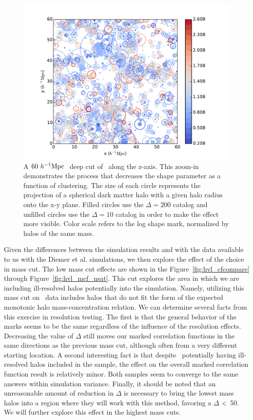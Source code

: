 \documentclass[usenatbib,usegraphicx,letterpaper]{mn2e}
\begin{document}
\begin{figure}
	\centering
	\includegraphics[width=1\textwidth]{plotcircles_coolwarm.pdf}
	\caption{A $60 \ h^{-1}\mathrm{Mpc}~$ deep cut of \simB \ along the z-axis. This zoom-in demonstrates the process that decreases the shape parameter as a function of clustering. The size of each circle represents the projection of a spherical dark matter halo with a given halo radius onto the x-y plane. Filled circles use the $\Delta = 200$ catalog and unfilled circles use the $\Delta = 10$ catalog in order to make the effect more visible. Color scale refers to the log shape mark, normalized by halos of the same mass.}
	\label{fig:plotcircles}
\end{figure}


Given the differences between the simulation results and with the data available to us with the Diemer et al. simulations, we then explore the effect of the choice in mass cut. The low mass cut effects are shown in the Figure~\ref{fig:hvl_cfcompare} through Figure~\ref{fig:hvl_mcf_nsat}. This cut explores the area in which we are including ill-resolved halos potentially into the simulation. Namely, utilizing this mass cut on \simB \ data includes halos that do not fit the form of the expected monotonic halo mass-concentration relation. We can determine several facts from this exercise in resolution testing. The first is that the general behavior of the marks seems to be the same regardless of the influence of the resolution effects. Decreasing the value of $\Delta$ still moves our marked correlation functions in the same directions as the previous mass cut, although often from a very different starting location. A second interesting fact is that despite \simA \ potentially having ill-resolved halos included in the sample, the effect on the overall marked correlation function result is relatively minor. Both samples seem to converge to the same answers within simulation variance. Finally, it should be noted that an unreasonable amount of reduction in $\Delta$ is necessary to bring the lowest mass halos into a region where they will work with this method, favoring a $\Delta$ \textless \ 50. We will further explore this effect in the highest mass cuts.
\end{document}

